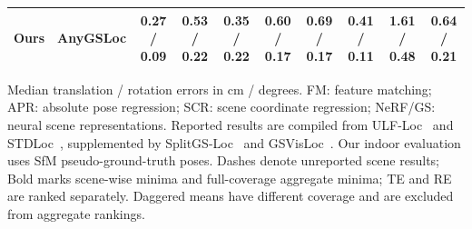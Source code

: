 \begin{table}[tp]
\begin{tabular}{lccccccccc}
\midrule
Ours & AnyGSLoc & \textbf{0.27} / \textbf{0.09} & 0.53 / 0.22 & \textbf{0.35} / 0.22 & \textbf{0.60} / 0.17 & \textbf{0.69} / \textbf{0.17} & 0.41 / \textbf{0.11} & 1.61 / 0.48 & 0.64 / 0.21 \\
\bottomrule
\end{tabular}
\par\smallskip\begin{minipage}{0.98\linewidth}\footnotesize Median translation / rotation errors in cm / degrees. FM: feature matching; APR: absolute pose regression; SCR: scene coordinate regression; NeRF/GS: neural scene representations. Reported results are compiled from ULF-Loc~\cite{gu2026ulfloc} and STDLoc~\cite{huang2025stdloc}, supplemented by SplitGS-Loc~\cite{lee2026splitgsloc} and GSVisLoc~\cite{khatib2025gsvisloc}. Our indoor evaluation uses SfM pseudo-ground-truth poses.  Dashes denote unreported scene results; Bold marks scene-wise minima and full-coverage aggregate minima; TE and RE are ranked separately. Daggered means have different coverage and are excluded from aggregate rankings.\end{minipage}
\end{table}

